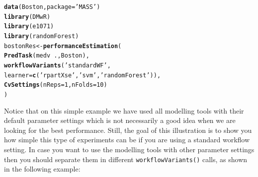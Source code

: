 \documentclass[10pt,a4paper]{article}\usepackage[]{graphicx}\usepackage[]{color}
\makeatletter
\newcommand{\hlnum}[1]{\textcolor[rgb]{0.686,0.059,0.569}{#1}}%
\newcommand{\hlstr}[1]{\textcolor[rgb]{0.192,0.494,0.8}{#1}}%
\newcommand{\hlopt}[1]{\textcolor[rgb]{0,0,0}{#1}}%
\newcommand{\hlstd}[1]{\textcolor[rgb]{0.345,0.345,0.345}{#1}}%
\newcommand{\hlkwb}[1]{\textcolor[rgb]{0.69,0.353,0.396}{#1}}%
\newcommand{\hlkwc}[1]{\textcolor[rgb]{0.333,0.667,0.333}{#1}}%
\newcommand{\hlkwd}[1]{\textcolor[rgb]{0.737,0.353,0.396}{\textbf{#1}}}%
\newenvironment{kframe}{%
 \def\at@end@of@kframe{}%
 \ifinner\ifhmode%
  \def\at@end@of@kframe{\end{minipage}}%
  \begin{minipage}{\columnwidth}%
 \fi\fi%
 \def\FrameCommand##1{\hskip\@totalleftmargin \hskip-\fboxsep
 \colorbox{shadecolor}{##1}\hskip-\fboxsep
     \hskip-\linewidth \hskip-\@totalleftmargin \hskip\columnwidth}%
 \MakeFramed {\advance\hsize-\width
   \@totalleftmargin\z@ \linewidth\hsize
   \@setminipage}}%
 {\par\unskip\endMakeFramed%
 \at@end@of@kframe}
\newenvironment{knitrout}{}{} %
\makeatother
\begin{document}
\begin{knitrout}
\color{fgcolor}\begin{kframe}
\begin{alltt}
\hlkwd{data}\hlstd{(Boston,}\hlkwc{package}\hlstd{=}\hlstr{'MASS'}\hlstd{)}
\hlkwd{library}\hlstd{(DMwR)}
\hlkwd{library}\hlstd{(e1071)}
\hlkwd{library}\hlstd{(randomForest)}
\hlstd{bostonRes} \hlkwb{<-} \hlkwd{performanceEstimation}\hlstd{(}
  \hlkwd{PredTask}\hlstd{(medv} \hlopt{~} \hlstd{.,Boston),}
  \hlkwd{workflowVariants}\hlstd{(}\hlstr{'standardWF'}\hlstd{,}
                   \hlkwc{learner}\hlstd{=}\hlkwd{c}\hlstd{(}\hlstr{'rpartXse'}\hlstd{,}\hlstr{'svm'}\hlstd{,}\hlstr{'randomForest'}\hlstd{)),}
  \hlkwd{CvSettings}\hlstd{(}\hlkwc{nReps}\hlstd{=}\hlnum{1}\hlstd{,}\hlkwc{nFolds}\hlstd{=}\hlnum{10}\hlstd{)}
  \hlstd{)}
\end{alltt}
\end{kframe}
\end{knitrout}


Notice that on this simple example we have used all modelling tools
with their default parameter settings which is not necessarily a good
idea when we are looking for the best performance. Still, the goal of
this illustration is to show you how simple this type of experiments
can be if you are using a standard workflow setting. In case you want
to use the modelling tools with other parameter settings then you
should separate them in different \texttt{workflowVariants()} calls, as shown
in the following example:
\end{document}
